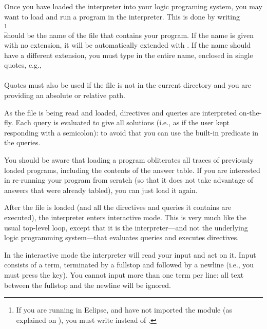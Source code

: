 Once you have loaded the interpreter into your logic programing system, you
may want to load and run a program in the interpreter. This is done by
writing\\
\ind{}%
\footnote{
  If you are running in Eclipse, and have not imported the module 
  (as explained on ), you must write 
  instead of .
}\\
 should be the name of the file that contains your program.
If the name is given with no extension, it will be automatically extended
with .%
%
If the name should have a different extension, you must type in the entire
name, enclosed in single quotes, e.g.,\\
\ind{}\\
Quotes must also be used if the file is not in the current directory and you
are providing an absolute or relative path.

As the file is being read and loaded, directives and queries are interpreted
on-the-fly. Each query is evaluated to give all solutions (i.e., as if the
user kept responding with a semicolon): to avoid that you can use the
built-in predicate  in the queries.

You should be aware that loading a program obliterates all traces of
previously loaded programs, including the contents of the answer table.  If
you are interested in re-running your program from scratch (so that it does
not take advantage of answers that were already tabled), you can just load it
again.

\vfill %



%

After the file is loaded (and all the directives and queries it contains are
executed), the interpreter enters interactive mode.  This is very much like
the usual top-level loop, except that it is the interpreter---and not the
underlying logic programming system---that evaluates queries and executes
directives.

In the interactive mode the interpreter will read your input and act on it.
Input consists of a term, terminated by a fullstop and followed by a newline
(i.e., you must press the  key). You cannot input more than one
term per line: all text between the fullstop and the newline will be ignored.

